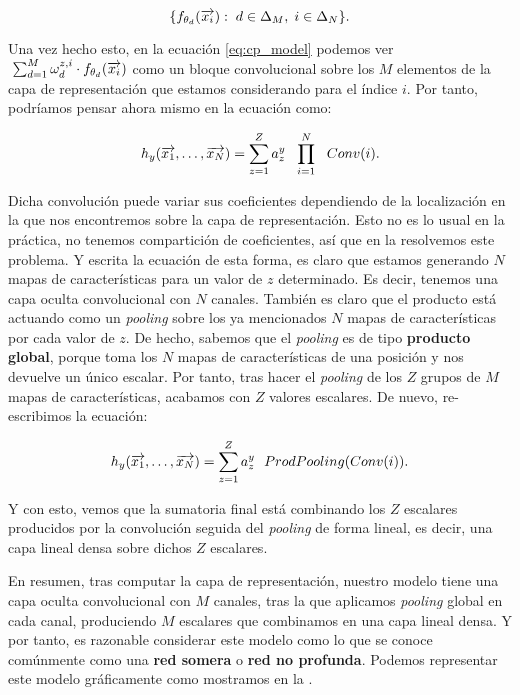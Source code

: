 \begin{equation}
    \{ f_{\theta_d}(\overrightarrow{x_i}) : \; d \in \Delta_{M}, \; i \in \Delta_{N} \}.
\end{equation}

Una vez hecho esto, en la ecuación \eqref{eq:cp_model} podemos ver $\; \sum_{d = 1}^{M} \omega^{z, i}_d \cdot f_{\theta_{d}}(\overrightarrow{x_i})$ como un bloque convolucional sobre los $M$ elementos de la capa de representación que estamos considerando para el índice $i$. Por tanto, podríamos pensar ahora mismo en la ecuación como:

\begin{equation}
	h_y(\overrightarrow{x_1}, \ldots, \overrightarrow{x_N}) =  \sum_{z = 1}^Z a_z^y \ \  \prod_{i = 1}^N \ \  Conv(i).
\end{equation}

Dicha convolución puede variar sus coeficientes dependiendo de la localización en la que nos encontremos sobre la capa de representación. Esto no es lo usual en la práctica, no tenemos compartición de coeficientes, así que en la  resolvemos este problema. Y escrita la ecuación de esta forma, es claro que estamos generando $N$ mapas de características para un valor de $z$ determinado. Es decir, tenemos una capa oculta convolucional con $N$ canales. También es claro que el producto está actuando como un \textit{pooling} sobre los ya mencionados $N$ mapas de características por cada valor de $z$. De hecho, sabemos que el \textit{pooling} es de tipo \textbf{producto global}, porque toma los $N$ mapas de características de una posición y nos devuelve un único escalar. Por tanto, tras hacer el \textit{pooling} de los $Z$ grupos de $M$ mapas de características, acabamos con $Z$ valores escalares. De nuevo, re-escribimos la ecuación:

\begin{equation}
	h_y(\overrightarrow{x_1}, \ldots, \overrightarrow{x_N}) =  \sum_{z = 1}^Z a_z^y \ \  ProdPooling( Conv(i) ).
\end{equation}

Y con esto, vemos que la sumatoria final está combinando los $Z$ escalares producidos por la convolución seguida del \textit{pooling} de forma lineal, es decir, una capa lineal densa sobre dichos $Z$ escalares.

En resumen, tras computar la capa de representación, nuestro modelo tiene una capa oculta convolucional con $M$ canales, tras la que aplicamos \textit{pooling} global en cada canal, produciendo $M$ escalares que combinamos en una capa lineal densa. Y por tanto, es razonable considerar este modelo como lo que se conoce comúnmente como una \textbf{red somera} o \textbf{red no profunda}. Podemos representar este modelo gráficamente como mostramos en la .

